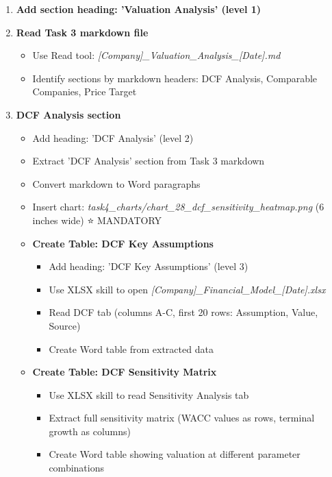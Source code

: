 \documentclass[11pt]{article}
\begin{document}
\begin{enumerate}[leftmargin=*,itemsep=2pt,topsep=2pt]
\item {} \textbf{Add section heading: 'Valuation Analysis' (level 1)}
\item {} \textbf{Read Task 3 markdown file}
\begin{itemize}[leftmargin=*,itemsep=2pt,topsep=2pt]
\item {} Use Read tool: \emph{[Company]\_\allowbreak{}Valuation\_\allowbreak{}Analysis\_\allowbreak{}[Date].md}
\item {} Identify sections by markdown headers: DCF Analysis, Comparable Companies, Price Target
\end{itemize}
\item {} \textbf{DCF Analysis section}
\begin{itemize}[leftmargin=*,itemsep=2pt,topsep=2pt]
\item {} Add heading: 'DCF Analysis' (level 2)
\item {} Extract 'DCF Analysis' section from Task 3 markdown
\item {} Convert markdown to Word paragraphs
\item {} Insert chart: \emph{task4\_\allowbreak{}charts/chart\_\allowbreak{}28\_\allowbreak{}dcf\_\allowbreak{}sensitivity\_\allowbreak{}heatmap.png} (6 inches wide) ⭐ MANDATORY
\item {} \textbf{Create Table: DCF Key Assumptions}
\begin{itemize}[leftmargin=*,itemsep=2pt,topsep=2pt]
\item {} Add heading: 'DCF Key Assumptions' (level 3)
\item {} Use XLSX skill to open \emph{[Company]\_\allowbreak{}Financial\_\allowbreak{}Model\_\allowbreak{}[Date].xlsx}
\item {} Read DCF tab (columns A-C, first 20 rows: Assumption, Value, Source)
\item {} Create Word table from extracted data
\end{itemize}
\item {} \textbf{Create Table: DCF Sensitivity Matrix}
\begin{itemize}[leftmargin=*,itemsep=2pt,topsep=2pt]
\item {} Use XLSX skill to read Sensitivity Analysis tab
\item {} Extract full sensitivity matrix (WACC values as rows, terminal growth as columns)
\item {} Create Word table showing valuation at different parameter combinations

\end{itemize}
\end{itemize}
\end{enumerate}
\end{document}
